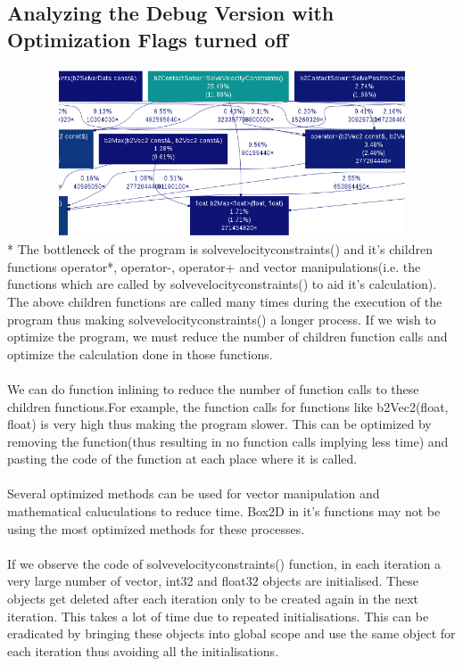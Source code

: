 \documentclass[11pt]{article}
\begin{document}
\subsection{Analyzing the Debug Version with Optimization Flags turned off}
\includegraphics[height=5.0cm,width=15cm]{doc/non-optimized}
\\*
The bottleneck of the program is solvevelocityconstraints() and it's children functions operator*, operator-, operator+ and vector manipulations(i.e. the functions which are called by solvevelocityconstraints() to aid it's calculation). The above children functions are called many times during the execution of the program thus making solvevelocityconstraints() a longer process. If we wish to optimize the program, we must reduce the number of children function calls and optimize the calculation done in those functions.
\cite{arora12}
\\
\\
We can do function inlining to reduce the number of function calls to these children functions.For example, the function calls for functions like b2Vec2(float, float) is very high thus making the program slower. This can be optimized by removing the function(thus resulting in no function calls implying less time) and pasting the code of the function at each place where it is called.
\\
\\
Several optimized methods can be used for vector manipulation and mathematical caluculations to reduce time. Box2D in it's functions may not be using the most optimized methods for these processes.
\\
\\
If we observe the code of solvevelocityconstraints() function, in each iteration a very large number of vector, int32 and float32 objects are initialised. These objects get deleted after each iteration only to be created again in the next iteration. This takes a lot of time due to repeated initialisations. This can be eradicated by bringing these objects into global scope and use the same object for each iteration thus avoiding all the initialisations.
\end{document}
